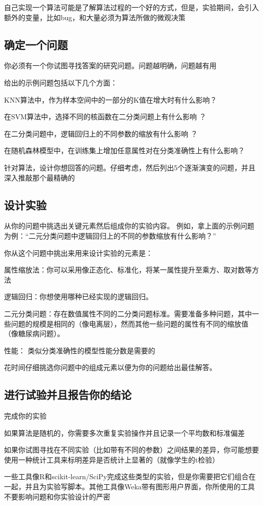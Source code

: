 自己实现一个算法可能是了解算法过程的一个好的方式，但是，实验期间，会引入额外的变量，比如bug，和大量必须为算法所做的微观决策
\subsection{确定一个问题}
你必须有一个你试图寻找答案的研究问题。问题越明确，问题越有用

给出的示例问题包括以下几个方面：

KNN算法中，作为样本空间中的一部分的K值在增大时有什么影响？

在SVM算法中，选择不同的核函数在二分类问题上有什么影响 ？

在二分类问题中，逻辑回归上的不同参数的缩放有什么影响 ？

在随机森林模型中，在训练集上增加任意属性对在分类准确性上有什么影响？

针对算法，设计你想回答的问题。仔细考虑，然后列出5个逐渐演变的问题，并且深入推敲那个最精确的
\subsection{设计实验}
从你的问题中挑选出关键元素然后组成你的实验内容。 例如，拿上面的示例问题为例：“二元分类问题中逻辑回归上的不同的参数缩放有什么影响？”

你从这个问题中挑出来用来设计实验的元素是：

属性缩放法：你可以采用像正态化、标准化，将某一属性提升至乘方、取对数等方法

逻辑回归：你想使用哪种已经实现的逻辑回归。

二元分类问题：存在数值属性不同的二分类问题标准。需要准备多种问题，其中一些问题的规模是相同的（像电离层），然而其他一些问题的属性有不同的缩放值（像糖尿病问题）。

性能： 类似分类准确性的模型性能分数是需要的

花时间仔细挑选你问题中的组成元素以便为你的问题给出最佳解答。
\subsection{进行试验并且报告你的结论}
完成你的实验

如果算法是随机的，你需要多次重复实验操作并且记录一个平均数和标准偏差

如果你试图寻找在不同实验（比如带有不同的参数）之间结果的差异，你可能想要使用一种统计工具来标明差异是否统计上显著的（就像学生的t检验）

一些工具像R和scikit-learn/SciPy完成这些类型的实验，但是你需要把它们组合在一起，并且为实验写脚本。其他工具像Weka带有图形用户界面，你所使用的工具不要影响问题和你实验设计的严密

